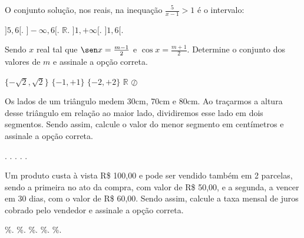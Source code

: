 \begin{question}%
O conjunto solução, nos reais, na inequação \(\frac{5}{x-1}> 1\) é o intervalo:
    \begin{tasks}
        \task \(]5,6[\).
        \task \(]-\infty,6[\).
        \task \(\mathbb{R}\).
        \task \(]1, +\infty[\).
        \task \(]1,6[\).
    \end{tasks}
\end{question}

\begin{question}%
Sendo \(x\) real tal que \(\sen x = \frac{m-1}{2}\) e \(\cos x = \frac{m+1}{2}\). Determine o conjunto dos valores de \(m\) e assinale a opção correta.
    \begin{tasks}
        \task \(\{-\sqrt{2},\sqrt{2}\}\)
        \task \(\{-1,+1\}\)
        \task \(\{-2,+2\}\)
        \task \(\mathbb{R}\)
        \task \(\oslash\)
    \end{tasks}
\end{question}

\begin{question}%
Os lados de um triângulo medem 30cm, 70cm e 80cm. Ao traçarmos a altura desse triângulo em relação ao maior lado, dividiremos esse lado em dois segmentos. Sendo assim, calcule o valor do menor segmento em centímetros e assinale a opção correta.
    \begin{tasks}
        .
        .
        .
        .
        .
    \end{tasks}
\end{question}

\begin{question}%
Um produto custa à vista R\$ 100,00 e pode ser vendido também em 2 parcelas, sendo a primeira no ato da compra, com valor de R\$ 50,00, e a segunda, a vencer em 30 dias, com o valor de R\$ 60,00. Sendo assim, calcule a taxa mensal de juros cobrado pelo vendedor e assinale a opção correta.
    \begin{tasks}
        \%.
        \%.
        \%.
        \%.
        \%.
    \end{tasks}
\end{question}


